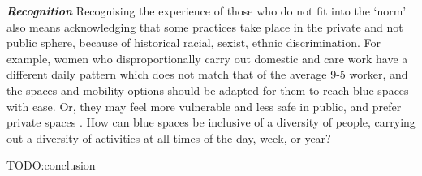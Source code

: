 \documentclass{article}
\newcommand{\bisection}[1]{\textbf{\textit{#1}}}
\begin{document}
\bisection{Recognition}
Recognising the experience of those who do not fit into the `norm' also means acknowledging that some practices take place in the private and not public sphere, because of historical racial, sexist, ethnic discrimination. For example, women who disproportionally carry out domestic and care work have a different daily pattern which does not match that of the average 9-5 worker, and the spaces and mobility options should be adapted for them to reach blue spaces with ease. Or, they may feel more vulnerable and less safe in public, and prefer private spaces \parencite{wessells2014urban}. How can blue spaces be inclusive of a diversity of people, carrying out a diversity of activities at all times of the day, week, or year? 

TODO:conclusion



\begin{comment}
	6. Importance of situating ??


Right to the city enabled through public blue space (in connection to recognition justice)

	1. Public blue spaces are a shared, common good, that everyone should be able to acces \parencite{wessells2014urban}	

	2. cite more general right to the city literature

	3. Sharing the benefits that waterfronts have on people and the environment
	
!!!!!! individuals and communities are inextricably linked to place, and disrupting place/not providing it threatens their existence / belonging

\end{comment}


\end{document}
